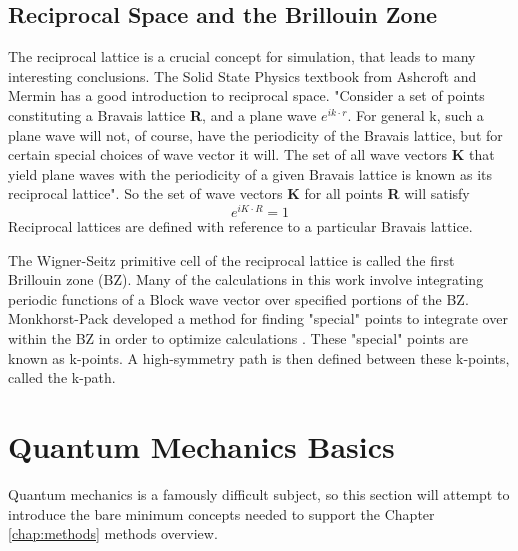\subsection{Reciprocal Space and the Brillouin Zone}

The reciprocal lattice is a crucial concept for simulation, that leads to many interesting conclusions. The Solid State Physics textbook from Ashcroft and Mermin has a good introduction to reciprocal space. 
"Consider a set of points constituting a Bravais lattice \textbf{R}, and a plane wave $e^{ik \cdot r}$. For general k, such a plane wave will not, of course, have the periodicity of the Bravais lattice, but for certain special choices of wave vector it will. The set of all wave vectors \textbf{K} that yield plane waves with the periodicity of a given Bravais lattice is known as its reciprocal lattice"\autocite{ashcroftSolidStatePhysics1976}. So the set of wave vectors \textbf{K} for all points \textbf{R} will satisfy $$e^{iK \cdot  R}=1 $$
Reciprocal lattices are defined with reference to a particular Bravais lattice.

 The Wigner-Seitz primitive cell of the reciprocal lattice is called the first Brillouin zone (BZ). Many of the calculations in this work involve integrating periodic functions of a Block wave vector over specified portions of the BZ. Monkhorst-Pack developed a method for finding "special" points to integrate over within the BZ in order to optimize calculations \autocite{monkhorstSpecialPointsBrillouinzone1976}. These "special" points are known as k-points. A high-symmetry path is then defined between these k-points, called the k-path. 

\section{Quantum Mechanics Basics}

Quantum mechanics is a famously difficult subject, so this section will attempt to introduce the bare minimum concepts needed to support the Chapter \ref{chap:methods} methods overview. 

